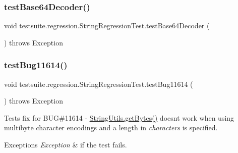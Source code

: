 \subsubsection{\texorpdfstring{test\+Base64\+Decoder()}{testBase64Decoder()}}
{\footnotesize\ttfamily void testsuite.\+regression.\+String\+Regression\+Test.\+test\+Base64\+Decoder (\begin{DoxyParamCaption}{ }\end{DoxyParamCaption}) throws Exception}

\mbox{\label{classtestsuite_1_1regression_1_1_string_regression_test_a06cd6f2ea6096ebef7516e5ed1ff3659}} 
\subsubsection{\texorpdfstring{test\+Bug11614()}{testBug11614()}}
{\footnotesize\ttfamily void testsuite.\+regression.\+String\+Regression\+Test.\+test\+Bug11614 (\begin{DoxyParamCaption}{ }\end{DoxyParamCaption}) throws Exception}

Tests fix for B\+UG\#11614 -\/ \mbox{\hyperlink{classcom_1_1mysql_1_1cj_1_1util_1_1_string_utils_a460ad9e9bb0873d806d2078891d8d416}{String\+Utils.\+get\+Bytes()}} doesn\textquotesingle{}t work when using multibyte character encodings and a length in {\itshape characters} is specified.


\begin{DoxyExceptions}{Exceptions}
{\em Exception} & if the test fails. \\
\hline
\end{DoxyExceptions}
\mbox{\label{classtestsuite_1_1regression_1_1_string_regression_test_a9c6c23e956d2ffe160c366e399016309}} 
